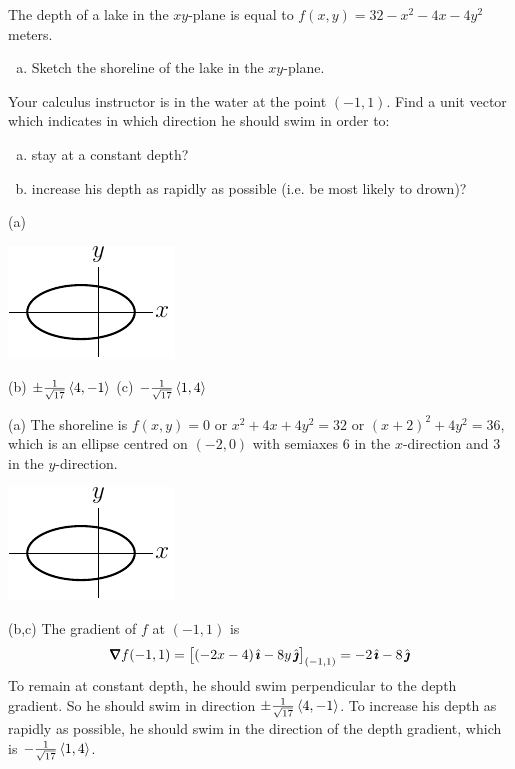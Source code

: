 \begin{question}[M200 2000A] %
The depth of a lake in the $xy$-plane is equal to 
   $f(x, y) = 32-x^2-4x-4y^2$ meters. 
\begin{enumerate}[(a)]
\item
Sketch the shoreline of the lake in the $xy$-plane. 
\end{enumerate}
Your calculus instructor is in the water at the point $(-1, 1)$. 
Find a unit vector which indicates in which direction he should swim 
in order to: 
\begin{enumerate}[(a)]
\item[(b)] 
stay at a constant depth? 
\item[(c)]
increase his depth as rapidly as possible (i.e. be most likely to drown)? 
\end{enumerate}
\end{question}

%

\begin{answer}
(a)
\begin{center}
     \includegraphics{fig/OE00AQ3.pdf}
\end{center}

(b) $\pm\frac{1}{\sqrt{17}}\left< 4,-1\right>$\qquad
(c) $-\frac{1}{\sqrt{17}}\left< 1,4\right>$
\end{answer}

\begin{solution}
(a) The shoreline is $f(x,y)=0$ or $x^2+4x+4y^2=32$ or $(x+2)^2+4y^2=36$,
which is an ellipse centred on $(-2,0)$ with semiaxes $6$ in the $x$-direction
and $3$ in the $y$-direction.
\begin{center}
     \includegraphics{fig/OE00AQ3.pdf}
\end{center}

(b,c) The gradient of $f$ at $(-1,1)$ is
\begin{equation*}
\vnabla f(-1,1)=\big[(-2x-4)\,\hi-8y\,\hj\big]_{(-1,1)}=-2\,\hi-8\,\hj
\end{equation*}
To remain at constant depth, he should swim perpendicular to the depth
gradient. So he should swim in direction $\pm\frac{1}{\sqrt{17}}\left< 4,-1\right>$.
To increase his depth as rapidly as possible, he should swim in the direction
of the depth gradient, which is $-\frac{1}{\sqrt{17}}\left< 1,4\right>$.
\end{solution}

